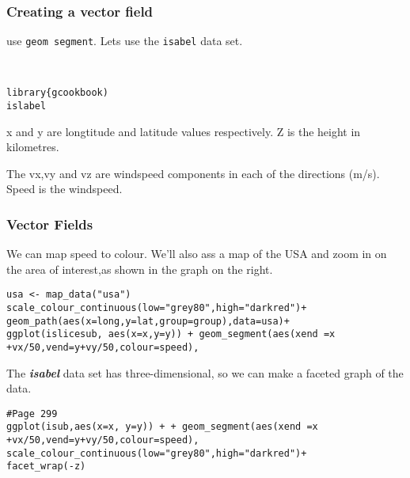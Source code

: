 \documentclass{beamer}
\begin{document}
%



\begin{frame}[fragile]
\frametitle{Creating a vector field}
use \texttt{geom segment}. Lets use the \texttt{isabel} data set.



\begin{framed}
\begin{verbatim}


library{gcookbook)
islabel

\end{verbatim}
\end{framed}
x and y are longtitude and latitude values respectively.
Z is the height in kilometres.

The vx,vy and vz are windspeed components in each of the directions (m/s).
Speed is the windspeed.

\end{frame}
\begin{frame}[fragile]
\frametitle{Vector Fields}
We can map speed to colour. We'll also ass a map of 
the USA and zoom in on the area of interest,as shown in the graph on the right.

\begin{framed}
\begin{verbatim}
usa <- map_data("usa")
scale_colour_continuous(low="grey80",high="darkred")+
geom_path(aes(x=long,y=lat,group=group),data=usa)+
ggplot(islicesub, aes(x=x,y=y)) + geom_segment(aes(xend =x +vx/50,vend=y+vy/50,colour=speed),
\end{verbatim}
\end{framed}
\end{frame}
\begin{frame}[fragile]
The \textbf{\textit{isabel}} data set has three-dimensional, so we can make a faceted graph of the data.
\begin{framed}
\begin{verbatim}
#Page 299
ggplot(isub,aes(x=x, y=y)) + + geom_segment(aes(xend =x +vx/50,vend=y+vy/50,colour=speed),
scale_colour_continuous(low="grey80",high="darkred")+
facet_wrap(-z)
\end{verbatim}
\end{framed}
\end{frame}
\end{document}
